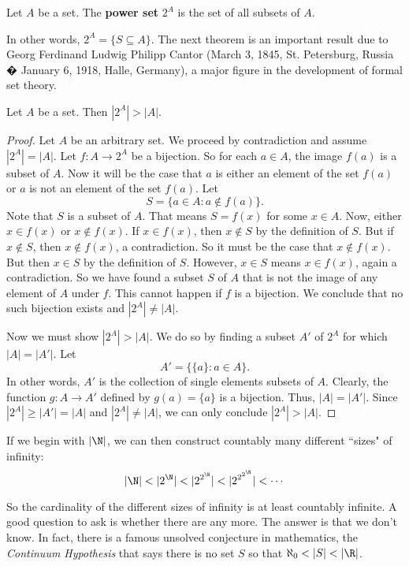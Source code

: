 \begin{definition} Let $A$ be a set. The \textbf{power set} $2^A$ is the set of all subsets of $A$. 
\end{definition}

In other words, $2^A= \{ S \subseteq A\}$. The next theorem is an important result due to Georg Ferdinand Ludwig Philipp Cantor (March 3, 1845, St. Petersburg, Russia � January 6, 1918, Halle, Germany), a major figure in the development of formal set theory. 

\begin{theorem} Let $A$ be a set. Then $|2^A| > |A|$. 
\end{theorem}

\begin{proof} Let $A$ be an arbitrary set. We proceed by contradiction and assume $|2^A| = |A|$. Let $f : A \to 2^A$ be a bijection. So for each $a \in A$, the image $f(a)$ is a subset of $A$. Now it will be the case that $a$ is either an element of the set $f(a)$ or $a$ is not an element of the set $f(a)$. Let 
\[S = \{a \in A : a \notin f(a)\}.\]
Note that $S$ is a subset of $A$. That means $S = f(x)$ for some $x \in A$. Now, either $x \in f(x)$ or $x \notin f(x)$. If $x \in f(x)$, then $x \notin S$ by the definition of $S$. But if $x \notin S$, then $x \notin f(x)$, a contradiction. So it must be the case that $x \notin f(x)$. But then $x \in S$ by the definition of $S$. However, $x \in S$ means $x \in f(x)$, again a contradiction. So we have found a subset $S$ of $A$ that is not the image of any element of $A$ under $f$. This cannot happen if $f$ is a bijection. We conclude that no such bijection exists and $|2^A| \neq |A|$. 

Now we must show $|2^A| > |A|$. We do so by finding a subset $A'$ of $2^A$ for which $|A| = |A'|$. Let 
\[A' = \{\{a\} : a \in A\}.\]
In other words, $A'$ is the collection of single elements subsets of $A$. Clearly, the function $g : A \to A'$ defined by $g(a) = \{a\}$ is a bijection. Thus, $|A| = |A'|$. Since $|2^A| \geq |A'| = |A|$ and $|2^A| \neq |A|$, we can only conclude $|2^A| > |A|$. 
\end{proof}
 
If we begin with $|\N|$, we can then construct countably many different ``sizes" of infinity:
\[|\N| < |2^{\N}| < |2^{2^{\N}}| < |2^{2^{2^{\N}}}| < \cdots \]

So the cardinality of the different sizes of infinity is at least countably infinite. A good question to ask is whether there are any more. The answer is that we don't know. In fact, there is a famous unsolved conjecture in mathematics, the \emph{Continuum Hypothesis} that says there is no set $S$ so that $\aleph_0 < |S| < |\R|$. 


